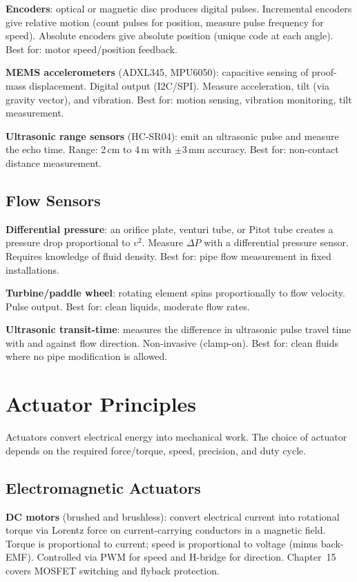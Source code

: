 \documentclass[11pt,letterpaper,twoside,openany]{book}
\begin{document}
\textbf{Encoders}: optical or magnetic disc produces digital pulses. Incremental encoders give relative motion (count pulses for position, measure pulse frequency for speed). Absolute encoders give absolute position (unique code at each angle). Best for: motor speed/position feedback.

\textbf{MEMS accelerometers} (ADXL345, MPU6050): capacitive sensing of proof-mass displacement. Digital output (I2C/SPI). Measure acceleration, tilt (via gravity vector), and vibration. Best for: motion sensing, vibration monitoring, tilt measurement.

\textbf{Ultrasonic range sensors} (HC-SR04): emit an ultrasonic pulse and measure the echo time. Range: 2\,cm to 4\,m with $\pm$3\,mm accuracy. Best for: non-contact distance measurement.

\subsection{Flow Sensors}
\textbf{Differential pressure}: an orifice plate, venturi tube, or Pitot tube creates a pressure drop proportional to $v^2$. Measure $\Delta P$ with a differential pressure sensor. Requires knowledge of fluid density. Best for: pipe flow measurement in fixed installations.

\textbf{Turbine/paddle wheel}: rotating element spins proportionally to flow velocity. Pulse output. Best for: clean liquids, moderate flow rates.

\textbf{Ultrasonic transit-time}: measures the difference in ultrasonic pulse travel time with and against flow direction. Non-invasive (clamp-on). Best for: clean fluids where no pipe modification is allowed.

\section{Actuator Principles}

Actuators convert electrical energy into mechanical work. The choice of actuator depends on the required force/torque, speed, precision, and duty cycle.

\subsection{Electromagnetic Actuators}
\textbf{DC motors} (brushed and brushless): convert electrical current into rotational torque via Lorentz force on current-carrying conductors in a magnetic field. Torque is proportional to current; speed is proportional to voltage (minus back-EMF). Controlled via PWM for speed and H-bridge for direction. Chapter~15 covers MOSFET switching and flyback protection.
\end{document}
